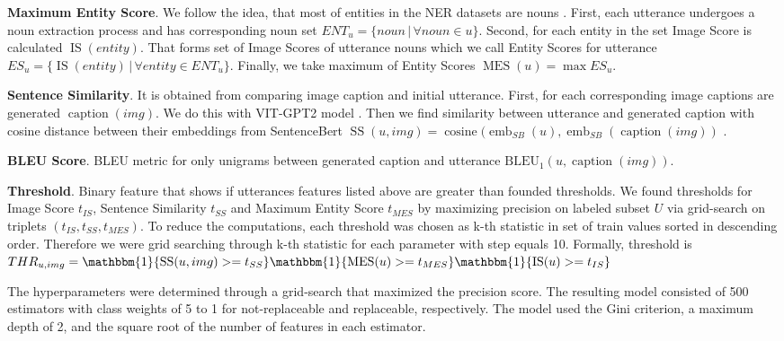 \documentclass[11pt]{article}
\begin{document}
\smallskip

\textbf{Maximum Entity Score}. We follow the idea, that most of entities in the NER datasets are nouns \cite{Noun-based}. First, each utterance undergoes a noun extraction process and has corresponding noun set $ENT_u = \{noun \, | \, \forall noun \in u \}$.  Second, for each entity in the set Image Score is calculated $\operatorname{IS}(entity)$. That forms set of Image Scores of utterance nouns which we call Entity Scores for utterance $ES_u = \{\operatorname{IS}(entity) \, | \, \forall entity \in ENT_u \}$. Finally, we take maximum of Entity Scores $\operatorname{MES}(u) = \max ES_u$.

\smallskip

\textbf{Sentence Similarity}. It is obtained from comparing image caption and initial utterance. First, for each corresponding image captions are generated $\operatorname{caption}(img)$. We do this with VIT-GPT2 model \cite{kumar2022imagecaptioning}. Then we find similarity between utterance and generated caption with cosine distance between their embeddings from SentenceBert $\operatorname{SS}(u,img) = \operatorname{cosine}(\operatorname{emb}_{SB}(u), \operatorname{emb}_{SB}(\operatorname{caption}(img))$ \cite{reimers-2019-sentence-bert} . 

\smallskip

\textbf{BLEU Score}. BLEU \cite{bleu} metric for only unigrams between generated caption and utterance $\operatorname{BLEU_1}(u, \operatorname{caption}(img))$.

\smallskip

\textbf{Threshold}. Binary feature that shows if utterances features listed above are greater than founded thresholds. We found thresholds for Image Score $t_{IS}$, Sentence Similarity $t_{SS}$ and Maximum Entity Score $t_{MES}$ by maximizing precision on labeled subset $U$ via grid-search on triplets $(t_{IS}, t_{SS}, t_{MES})$. To reduce the computations, each threshold was chosen as k-th statistic in set of train values sorted in descending order. Therefore we were grid searching through k-th statistic for each parameter with step equals 10. Formally, threshold is $THR_{u, img} =  \mathbbm{1} \{\operatorname{SS}(u,img) >= t_{SS}\} \mathbbm{1} \{\operatorname{MES}(u) >= t_{MES}\} \mathbbm{1} \{\operatorname{IS}(u) >= t_{IS}\}$

\smallskip

The hyperparameters were determined through a grid-search that maximized the precision score. The resulting model consisted of 500 estimators with class weights of 5 to 1 for not-replaceable and replaceable, respectively. The model used the Gini criterion, a maximum depth of 2, and the square root of the number of features in each estimator.
\end{document}
